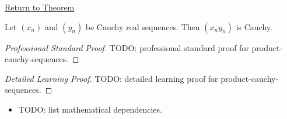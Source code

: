\newpage
{}
\label{prf:product-cauchy-sequences}

\begin{remark*}[Return]
\hyperref[thm:product-cauchy-sequences]{Return to Theorem}
\end{remark*}

\begin{theorem*}
Let $(x_n)$ and $(y_n)$ be Cauchy real sequences. Then $(x_ny_n)$ is
Cauchy.

\smallskip
\noindent
\end{theorem*}

\begin{proof}[Professional Standard Proof]
\LRAProofBodyStart
TODO: professional standard proof for product-cauchy-sequences.
\end{proof}

\begin{proof}[Detailed Learning Proof]
\LRAProofBodyStart
TODO: detailed learning proof for product-cauchy-sequences.
\end{proof}

\begin{remark*}
\end{remark*}

\begin{dependencies}
\begin{itemize}
  \item TODO: list mathematical dependencies.
\end{itemize}
\end{dependencies}

\clearpage
